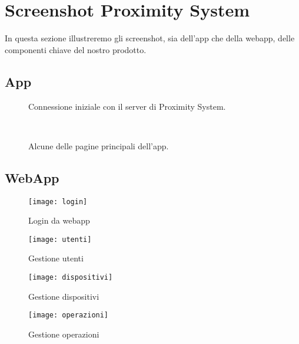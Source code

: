 \chapter{Screenshot Proximity System}

In questa sezione illustreremo gli screenshot, sia dell'app che della webapp, delle componenti chiave del nostro prodotto.

\section{App}
\begin{figure}[htpb!]
  \centering
   \quad
  \caption{Connessione iniziale con il server di Proximity System.}
  \label{fig:subfig}
\end{figure}

\begin{figure}[htpb!]
  \centering
   \quad
   \\
   \quad
  \caption{Alcune delle pagine principali dell'app.}
  \label{fig:subfig}
\end{figure}
\newpage
\section{WebApp}

\begin{figure}[htpb!]
  \centering
  \texttt{[image: login]}
  \caption{Login da webapp}
  \label{fig:login}
\end{figure}

\begin{figure}[htpb!]
  \centering
  \texttt{[image: utenti]}
  \caption{Gestione utenti}
  \label{fig:utenti}
\end{figure}

\begin{figure}[htpb!]
  \centering
  \texttt{[image: dispositivi]}
  \caption{Gestione dispositivi}
  \label{fig:dispositivi}
\end{figure}

\begin{figure}[htpb!]
  \centering
  \texttt{[image: operazioni]}
  \caption{Gestione operazioni}
  \label{fig:operazioni}
\end{figure}
